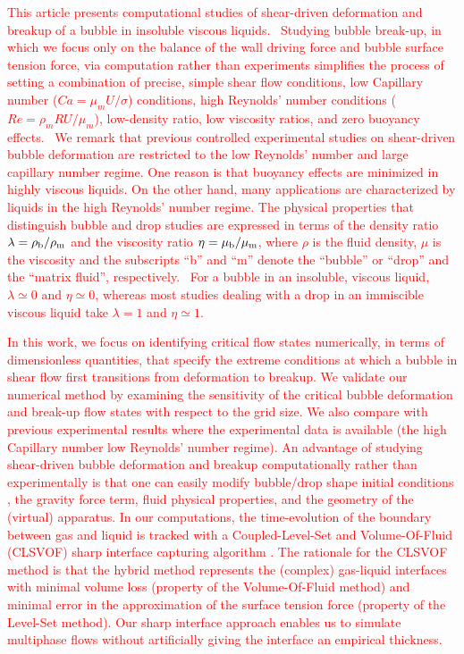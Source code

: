 \documentclass{elsarticle}
\begin{document}
\textcolor{red} {
	This article presents computational studies of shear-driven deformation and breakup of a bubble in insoluble viscous liquids.  Studying bubble break-up, in which we focus only on the balance of the wall driving force and bubble surface tension force, via computation rather than experiments simplifies the process of setting a combination of precise, simple shear flow conditions, low Capillary number ($Ca=\mu_{m}U/\sigma$) conditions, high Reynolds' number conditions ($Re=\rho_{m} R U/\mu_{m}$), low-density ratio, low viscosity ratios, and zero buoyancy effects.  We remark that previous controlled experimental studies on shear-driven bubble deformation are restricted to the low Reynolds' number and large capillary number regime\cite{RusMan02,CanedoETAL}.  One reason is that buoyancy effects are minimized in highly viscous liquids.  On the other hand, many applications are characterized by liquids in the high Reynolds' number regime.  The physical properties that distinguish bubble and drop studies are expressed in terms of the density ratio $\lambda = \rho_{\rm b} / \rho_{\rm m}$ and the viscosity ratio $\eta = \mu_{\rm b} / \mu_{\rm m}$, where $\rho$ is the fluid density, $\mu$ is the viscosity and the subscripts ``b'' and ``m'' denote the ``bubble'' or ``drop'' and the ``matrix fluid'', respectively.  For a bubble in an insoluble, viscous liquid, $\lambda \simeq 0$ and $\eta \simeq 0$, whereas most studies dealing with a drop in an immiscible viscous liquid take $\lambda =1$ and $\eta \simeq 1$.  
}
\par
\textcolor{red} {
	In this work, we focus on identifying critical flow states numerically, in terms of dimensionless quantities, that specify the extreme conditions at which a bubble in shear flow first transitions from deformation to breakup.  We validate our numerical method by examining the sensitivity of the critical bubble deformation and break-up flow states with respect to the grid size.  We also compare with previous experimental results where the experimental data is available (the high Capillary number low Reynolds' number regime).  An advantage of studying shear-driven bubble deformation and breakup computationally rather than experimentally is that one can easily modify bubble/drop shape initial conditions \cite{ohta2005computational}, the gravity force term\cite{hoyt2013performance}, fluid physical properties, and the geometry of the (virtual) apparatus\cite{FRENSE2024120579}.  In our computations, the time-evolution of the boundary between gas and liquid is tracked with a Coupled-Level-Set and Volume-Of-Fluid (CLSVOF) sharp interface capturing algorithm \cite{SusPuc00,SusSmiHusOhtZhi07}.  The rationale for the CLSVOF method is that the hybrid method represents the (complex) gas-liquid interfaces with minimal volume loss (property of the Volume-Of-Fluid method) and minimal error in the approximation of the surface tension force (property of the Level-Set method).  Our sharp interface approach\cite{SusSmiHusOhtZhi07,Sus03,KanFedLiu00} enables us to simulate multiphase flows without artificially giving the interface an empirical thickness.
}
\end{document}
